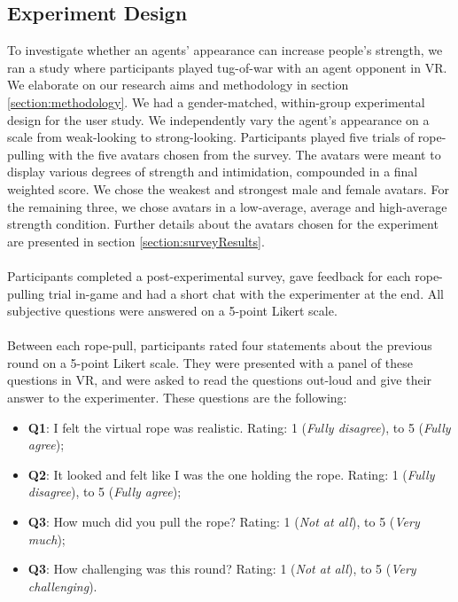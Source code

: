 \subsection{Experiment Design}
\label{subsection:ExperimentDesign}
To investigate whether an agents' appearance can increase people's strength, we ran a study where participants played tug-of-war with an agent opponent in VR. We elaborate on our research aims and methodology in section \ref{section:methodology}. We had a gender-matched, within-group experimental design for the user study. We independently vary the agent's appearance on a scale from weak-looking to strong-looking. Participants played five trials of rope-pulling with the five avatars chosen from the survey. The avatars were meant to display various degrees of strength and intimidation, compounded in a final weighted score. We chose the weakest and strongest male and female avatars. For the remaining three, we chose avatars in a low-average, average and high-average strength condition. Further details about the avatars chosen for the experiment are presented in section \ref{section:surveyResults}. \\
\\
Participants completed a post-experimental survey, gave feedback for each rope-pulling trial in-game and had a short chat with the experimenter at the end. All subjective questions were answered on a 5-point Likert scale.\\
\\
Between each rope-pull, participants rated four statements about the previous round on a 5-point Likert scale. They were presented with a panel of these questions in VR, and were asked to read the questions out-loud and give their answer to the experimenter. These questions are the following:
\begin{itemize}
\label{enum:presenceQuestions}
\itemsep0em
\item \textbf{Q1}: I felt the virtual rope was realistic. Rating: 1 (\textit{Fully disagree}), to 5 (\textit{Fully agree});
\item \textbf{Q2}: It looked and felt like I was the one holding the rope. Rating: 1 (\textit{Fully disagree}), to 5 (\textit{Fully agree});
 \item \textbf{Q3}: How much did you pull the rope? Rating: 1 (\textit{Not at all}), to 5 (\textit{Very much});
\item \textbf{Q3}: How challenging was this round? Rating: 1 (\textit{Not at all}), to 5 (\textit{Very challenging}).
\end{itemize}
